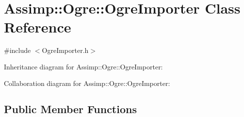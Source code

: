 \hypertarget{class_assimp_1_1_ogre_1_1_ogre_importer}{\section{Assimp\+:\+:Ogre\+:\+:Ogre\+Importer Class Reference}
\label{class_assimp_1_1_ogre_1_1_ogre_importer}
}


{\ttfamily \#include $<$Ogre\+Importer.\+h$>$}



Inheritance diagram for Assimp\+:\+:Ogre\+:\+:Ogre\+Importer\+:


Collaboration diagram for Assimp\+:\+:Ogre\+:\+:Ogre\+Importer\+:
\subsection*{Public Member Functions}
